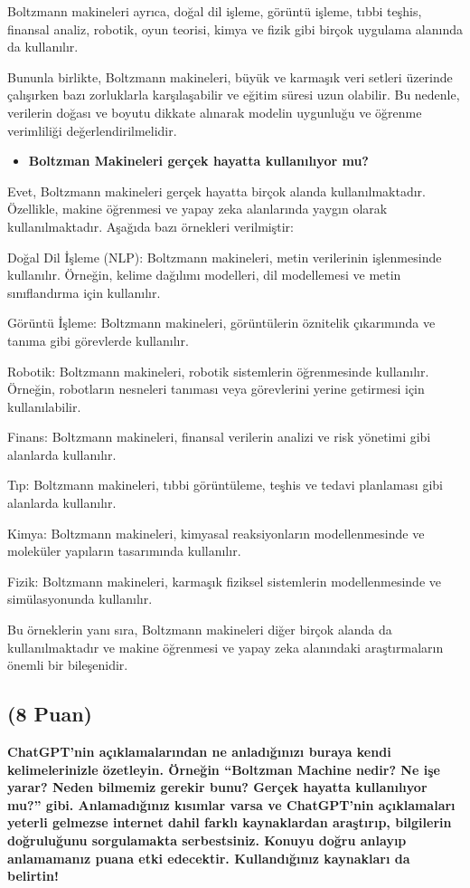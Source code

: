 \documentclass[11pt]{article}
\begin{document}
Boltzmann makineleri ayrıca, doğal dil işleme, görüntü işleme, tıbbi teşhis, finansal analiz, robotik, oyun teorisi, kimya ve fizik gibi birçok uygulama alanında da kullanılır.

Bununla birlikte, Boltzmann makineleri, büyük ve karmaşık veri setleri üzerinde çalışırken bazı zorluklarla karşılaşabilir ve eğitim süresi uzun olabilir. Bu nedenle, verilerin doğası ve boyutu dikkate alınarak modelin uygunluğu ve öğrenme verimliliği değerlendirilmelidir.

\begin{itemize}
    \item \textbf{Boltzman Makineleri gerçek hayatta kullanılıyor mu?}
\end{itemize}

Evet, Boltzmann makineleri gerçek hayatta birçok alanda kullanılmaktadır. Özellikle, makine öğrenmesi ve yapay zeka alanlarında yaygın olarak kullanılmaktadır. Aşağıda bazı örnekleri verilmiştir:

Doğal Dil İşleme (NLP): Boltzmann makineleri, metin verilerinin işlenmesinde kullanılır. Örneğin, kelime dağılımı modelleri, dil modellemesi ve metin sınıflandırma için kullanılır.

Görüntü İşleme: Boltzmann makineleri, görüntülerin öznitelik çıkarımında ve tanıma gibi görevlerde kullanılır.

Robotik: Boltzmann makineleri, robotik sistemlerin öğrenmesinde kullanılır. Örneğin, robotların nesneleri tanıması veya görevlerini yerine getirmesi için kullanılabilir.

Finans: Boltzmann makineleri, finansal verilerin analizi ve risk yönetimi gibi alanlarda kullanılır.

Tıp: Boltzmann makineleri, tıbbi görüntüleme, teşhis ve tedavi planlaması gibi alanlarda kullanılır.

Kimya: Boltzmann makineleri, kimyasal reaksiyonların modellenmesinde ve moleküler yapıların tasarımında kullanılır.

Fizik: Boltzmann makineleri, karmaşık fiziksel sistemlerin modellenmesinde ve simülasyonunda kullanılır.

Bu örneklerin yanı sıra, Boltzmann makineleri diğer birçok alanda da kullanılmaktadır ve makine öğrenmesi ve yapay zeka alanındaki araştırmaların önemli bir bileşenidir.


\subsection{(8 Puan)} \textbf{ChatGPT’nin açıklamalarından ne anladığınızı buraya kendi kelimelerinizle özetleyin. Örneğin ``Boltzman Machine nedir? Ne işe yarar? Neden bilmemiz gerekir bunu? Gerçek hayatta kullanılıyor mu?'' gibi. Anlamadığınız kısımlar varsa ve ChatGPT’nin açıklamaları yeterli gelmezse internet dahil farklı kaynaklardan araştırıp, bilgilerin doğruluğunu sorgulamakta serbestsiniz. Konuyu doğru anlayıp anlamamanız puana etki edecektir. Kullandığınız kaynakları da belirtin!}
\end{document}
